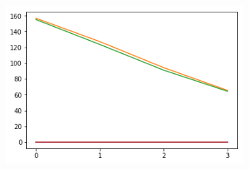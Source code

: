 \begin{figure}[h!]
\begin{subfigure}[b]{0.3\linewidth}
    \caption{}
  \end{subfigure}
  \begin{subfigure}[b]{0.3\linewidth}
    \includegraphics[width=\linewidth]{images/add/ef2_means_pos.png}
    \caption{}
  \end{subfigure}
  

\end{figure}
